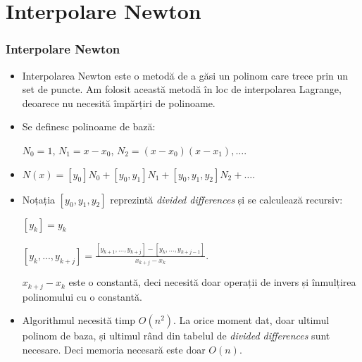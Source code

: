 \documentclass{beamer}
\begin{document}
\section{Interpolare Newton}
\begin{frame}
\frametitle{Interpolare Newton}
\begin{itemize}
\item
Interpolarea Newton este o metodă de a găsi un polinom care trece prin un set de puncte.
Am folosit această metodă în loc de interpolarea Lagrange, deoarece nu necesită împărțiri de polinoame.
\item
Se definesc polinoame de bază:

$N_0 = 1$, $N_1 = x - x_0$, $N_2 = (x - x_0)(x - x_1), \ldots$.

\item
$N(x) = [y_0] N_0 + [y_0, y_1] N_1 + [y_0, y_1, y_2] N_2 + \ldots$.

\item
Noțația $[y_0, y_1, y_2]$ reprezintă \textit{divided differences} și se calculează recursiv:


$[y_k] = y_k$

$[y_k, ..., y_{k+j}] = \frac{[y_{k+1}, ..., y_{k+j}] - [y_k, ..., y_{k+j-1}]}{x_{k+j} - x_k}$.

${x_{k+j} - x_k}$ este o constantă, deci necesită doar operații de invers și înmulțirea polinomului cu o constantă.

\item
Algorithmul necesită timp $O(n^2)$.
La orice moment dat, doar ultimul polinom de baza, și ultimul rând din tabelul de \textit{divided differences} sunt necesare.
Deci memoria necesară este doar $O(n)$.
\end{itemize}

\end{frame}
\end{document}
